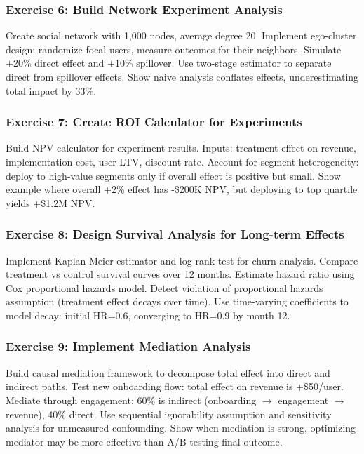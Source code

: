 \subsubsection{Exercise 6: Build Network Experiment Analysis}

Create social network with 1,000 nodes, average degree 20. Implement ego-cluster design: randomize focal users, measure outcomes for their neighbors. Simulate +20\% direct effect and +10\% spillover. Use two-stage estimator to separate direct from spillover effects. Show naive analysis conflates effects, underestimating total impact by 33\%.

\subsubsection{Exercise 7: Create ROI Calculator for Experiments}

Build NPV calculator for experiment results. Inputs: treatment effect on revenue, implementation cost, user LTV, discount rate. Account for segment heterogeneity: deploy to high-value segments only if overall effect is positive but small. Show example where overall +2\% effect has -\$200K NPV, but deploying to top quartile yields +\$1.2M NPV.

\subsubsection{Exercise 8: Design Survival Analysis for Long-term Effects}

Implement Kaplan-Meier estimator and log-rank test for churn analysis. Compare treatment vs control survival curves over 12 months. Estimate hazard ratio using Cox proportional hazards model. Detect violation of proportional hazards assumption (treatment effect decays over time). Use time-varying coefficients to model decay: initial HR=0.6, converging to HR=0.9 by month 12.

\subsubsection{Exercise 9: Implement Mediation Analysis}

Build causal mediation framework to decompose total effect into direct and indirect paths. Test new onboarding flow: total effect on revenue is +\$50/user. Mediate through engagement: 60\% is indirect (onboarding $\rightarrow$ engagement $\rightarrow$ revenue), 40\% direct. Use sequential ignorability assumption and sensitivity analysis for unmeasured confounding. Show when mediation is strong, optimizing mediator may be more effective than A/B testing final outcome.

